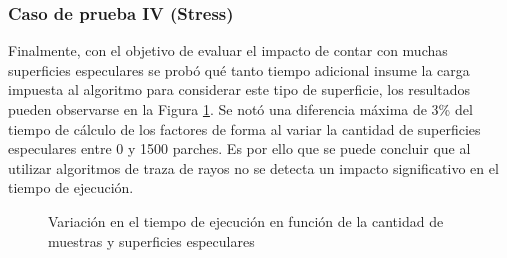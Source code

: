 \subsubsection{Caso de prueba IV (Stress)}

Finalmente, con el objetivo de evaluar el impacto de contar con muchas superficies especulares se probó qué tanto tiempo adicional insume la carga impuesta al algoritmo para considerar este tipo de superficie, los resultados pueden observarse en la Figura \ref{plot:este}. Se notó una diferencia máxima de 3\% del tiempo de cálculo de los factores de forma al variar la cantidad de superficies especulares entre 0 y 1500 parches. Es por ello que se puede concluir que al utilizar algoritmos de traza de rayos no se detecta un impacto significativo en el tiempo de ejecución.

\begin{figure}
\caption{Variación en el tiempo de ejecución en función de la cantidad de muestras y superficies especulares}
\label{plot:este}
\end{figure}

